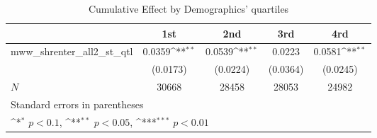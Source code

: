 \begin{table}[htbp]\centering
\def\sym#1{\ifmmode^{#1}\else\(^{#1}\)\fi}
\caption{Cumulative Effect by Demographics' quartiles}
\begin{tabular}{l*{4}{c}}
\hline\hline
            &\multicolumn{1}{c}{1st}&\multicolumn{1}{c}{2nd}&\multicolumn{1}{c}{3rd}&\multicolumn{1}{c}{4rd}\\
\hline
mww\_shrenter\_all2\_st\_qtl&      0.0359\sym{**} &      0.0539\sym{**} &      0.0223         &      0.0581\sym{**} \\
            &    (0.0173)         &    (0.0224)         &    (0.0364)         &    (0.0245)         \\
\hline
\(N\)       &       30668         &       28458         &       28053         &       24982         \\
\hline\hline
\multicolumn{5}{l}{\footnotesize Standard errors in parentheses}\\
\multicolumn{5}{l}{\footnotesize \sym{*} \(p<0.1\), \sym{**} \(p<0.05\), \sym{***} \(p<0.01\)}\\
\end{tabular}
\end{table}
